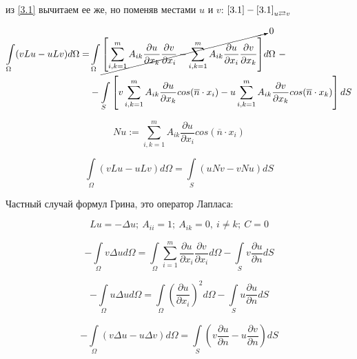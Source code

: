 \documentclass[12pt, a4paper]{article}
\begin{document}
из \eqref{3.1} вычитаем ее же, но поменяв местами $u$ и $v$: \qquad $ \eqref{3.1} - \eqref{3.1}_{u \rightleftarrows v} $

\begin{equation*}
	\begin{split}
		\int\limits_{\Omega }^{} (vLu - uLv) d\Omega = & \int\limits_{\Omega} \cancelto{0}{\left[ \sum_{i,k = 1}^{m}A_{ik} \frac{\partial u }{\partial x_k} \frac{\partial v }{\partial x_i} - \sum_{i,k = 1}^{m}A_{ik} \frac{\partial u }{\partial x_i} \frac{\partial v }{\partial x_k} \right]} d\Omega \ - \\
		& - \int\limits_{S} \left[ v \sum_{i,k =1}^{m} A_{ik} \frac{\partial u}{\partial x_k } cos(\overline{n} \cdot x_i ) - u \sum_{i,k =1}^{m} A_{ik} \frac{\partial v}{\partial x_k } cos(\overline{n} \cdot x_k )\right] dS
	\end{split}
\end{equation*}

\[ N u := \sum_{i,k=1}^{m } A_{ik } \frac{\partial u }{\partial x_i } cos(\overline{n} \cdot x_i) \]

\begin{equation}
	\label{3.3}
	\tag{3.3}
	\int\limits_{\Omega} \left( vLu - uLv \right) d\Omega = \int\limits_{S} \left( uNv - vNu \right) dS
\end{equation}

Частный случай формул Грина, это оператор Лапласа:

\[ Lu = - \Delta u; \ A_{ii} = 1; \ A_{ik} = 0, \ i \neq k; \ C = 0 \]

\begin{equation}
	\label{3.4}
	\tag{3.4}
	- \int\limits_{\Omega} v \Delta u d\Omega  = \int\limits_{\Omega}^{} \sum_{i=1}^{m } \frac{\partial u }{\partial x_i }  \frac{\partial v }{\partial x_i} d \Omega - \int\limits_{S }^{} v \frac{\partial u }{\partial n } dS
\end{equation}

\begin{equation}
	\label{3.5}
	\tag{3.5}
	- \int\limits_{\Omega} u \Delta u d \Omega = \int\limits_{\Omega}^{} {\left(\frac{\partial u }{\partial x_i}\right)}^2 d \Omega - \int\limits_{S }^{} u \frac{\partial u }{\partial n } dS
\end{equation}

\begin{equation}
	\label{3.6}
	\tag{3.6}
	- \int\limits_{\Omega} (v \Delta u - u \Delta v ) d\Omega = \int\limits_{S }^{} \left(v \frac{\partial u }{\partial n } - u \frac{\partial v}{\partial n}\right) dS
\end{equation}
\end{document}
